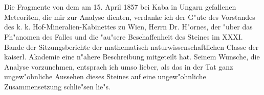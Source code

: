 \documentclass[a4paper, 11pt, oneside]{article}
\begin{document}
\setlength{\parskip}{1mm plus1mm minus1mm}
\clearpage
\tableofcontents
\clearpage
\LARGE
\pagestyle{fancy}
\fancyhf{}
\cfoot{\frakfamily{\thepage}}
\section{}
\paragraph{}
Die Fragmente von dem am 15. April 1857 bei Kaba in Ungarn gefallenen Meteoriten, die mir zur Analyse dienten, verdanke ich der G"ute des Vorstandes des k. k. Hof-Mineralien-Kabinettes zu Wien, Herrn Dr. H"ornes, der "uber das Ph"anomen des Falles und die "au"sere Beschaffenheit des Steines im XXXI. Bande der Sitzungsberichte der mathematisch-naturwissenschaftlichen Classe der kaiserl. Akademie eine n"ahere Beschreibung mitgeteilt hat. Seinem Wunsche, die Analyse vorzunehmen, entsprach ich umso lieber, als das in der Tat ganz ungew"ohnliche Aussehen dieses Steines auf eine ungew"ohnliche Zusammensetzung schlie"sen lie"s.
\end{document}
